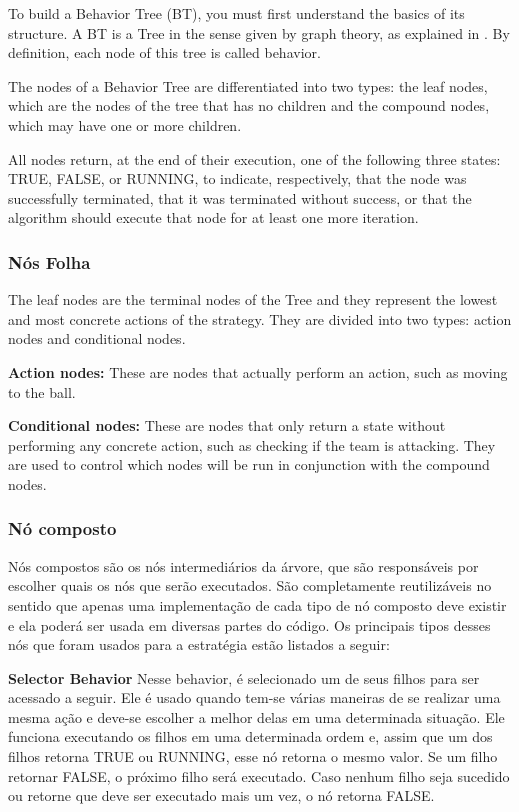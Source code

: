 \documentclass[conference]{IEEEtran}
\begin{document}
To build a Behavior Tree (BT), you must first understand the basics of its structure. A BT is a Tree in the sense given by graph theory, as explained in \cite{west2001introduction}. By definition, each node of this tree is called behavior.

The nodes of a Behavior Tree are differentiated into two types: the leaf nodes, which are the nodes of the tree that has no children and the compound nodes, which may have one or more children.

All nodes return, at the end of their execution, one of the following three states: TRUE, FALSE, or RUNNING, to indicate, respectively, that the node was successfully terminated, that it was terminated without success, or that the algorithm should execute that node for at least one more iteration.

\subsubsection{Nós Folha}


The leaf nodes are the terminal nodes of the Tree and they represent the lowest and most concrete actions of the strategy. They are divided into two types: action nodes and conditional nodes.

\textbf{Action nodes:} These are nodes that actually perform an action, such as moving to the ball.

\textbf{Conditional nodes:} These are nodes that only return a state without performing any concrete action, such as checking if the team is attacking. They are used to control which nodes will be run in conjunction with the compound nodes.

\subsubsection{Nó composto}

Nós compostos são os nós intermediários da árvore, que  são responsáveis por escolher quais os nós que serão executados. São completamente reutilizáveis no sentido que apenas uma implementação de cada tipo de nó composto deve existir e ela poderá ser usada em diversas partes do código. Os principais tipos desses nós que foram usados para a estratégia estão listados a seguir:

\textbf{Selector Behavior} Nesse behavior, é selecionado um de seus filhos para ser acessado a seguir. Ele é usado quando tem-se várias maneiras de se realizar uma mesma ação e deve-se escolher a melhor delas em uma determinada situação. Ele funciona executando os filhos em uma determinada ordem e, assim que um dos filhos retorna TRUE ou RUNNING, esse nó retorna o mesmo valor. Se um filho retornar FALSE, o próximo filho será executado. Caso nenhum filho seja sucedido ou retorne que deve ser executado mais um vez, o nó retorna FALSE.
\end{document}
